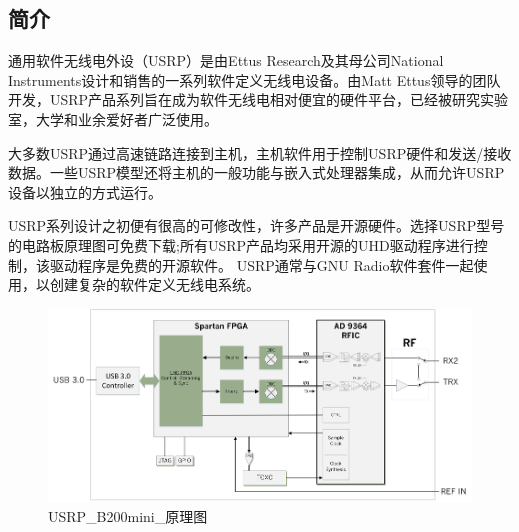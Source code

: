 		\subsection{简介}
			\par 通用软件无线电外设（USRP）是由Ettus Research及其母公司National Instruments设计和销售的一系列软件定义无线电设备。由Matt Ettus领导的团队开发，USRP产品系列旨在成为软件无线电相对便宜的硬件平台，已经被研究实验室，大学和业余爱好者广泛使用。
			\par 大多数USRP通过高速链路连接到主机，主机软件用于控制USRP硬件和发送/接收数据。一些USRP模型还将主机的一般功能与嵌入式处理器集成，从而允许USRP设备以独立的方式运行。
			\par USRP系列设计之初便有很高的可修改性，许多产品是开源硬件。选择USRP型号的电路板原理图可免费下载;所有USRP产品均采用开源的UHD驱动程序进行控制，该驱动程序是免费的开源软件。 USRP通常与GNU Radio软件套件一起使用，以创建复杂的软件定义无线电系统。\cite{ wiki:USRP}
			\begin{figure}[htb]
				\centering
				\includegraphics[width=13cm]{figures/USRP_B200mini_BD.png}
				\caption{USRP\_B200mini\_原理图}
				\label{fig:USRP_B200mini_原理图}
			\end{figure}
